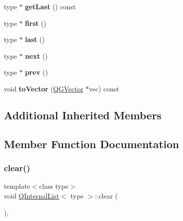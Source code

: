 \begin{DoxyCompactItemize}
\item 
\mbox{\label{class_q_internal_list_a68c3a15f8472d8eb12d623ec5e68a334}} 
type $\ast$ {\bfseries get\+Last} () const
\item 
\mbox{\label{class_q_internal_list_ae8cbf2169d1ead27eea89d76f9a83ffe}} 
type $\ast$ {\bfseries first} ()
\item 
\mbox{\label{class_q_internal_list_a299a4253a6642a480c025b92bfd604f9}} 
type $\ast$ {\bfseries last} ()
\item 
\mbox{\label{class_q_internal_list_a504cad26d8211e28cb9842de7fb21b01}} 
type $\ast$ {\bfseries next} ()
\item 
\mbox{\label{class_q_internal_list_a20635cb1613eb239b02d8dbec2c176c0}} 
type $\ast$ {\bfseries prev} ()
\item 
\mbox{\label{class_q_internal_list_a7ace8f35b37088f033417468b5010d51}} 
void {\bfseries to\+Vector} (\mbox{\hyperlink{class_q_g_vector}{Q\+G\+Vector}} $\ast$vec) const
\end{DoxyCompactItemize}
\subsection*{Additional Inherited Members}


\subsection{Member Function Documentation}
\mbox{\label{class_q_internal_list_a253a49ac0bce39e819358a602cf16c20}} 
\subsubsection{\texorpdfstring{clear()}{clear()}}
{\footnotesize\ttfamily template$<$class type$>$ \\
void \mbox{\hyperlink{class_q_internal_list}{Q\+Internal\+List}}$<$ type $>$\+::clear (\begin{DoxyParamCaption}{ }\end{DoxyParamCaption})\hspace{0.3cm}{\ttfamily [inline]}, {\ttfamily [virtual]}}

